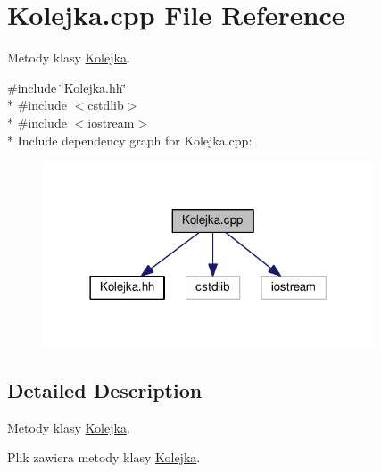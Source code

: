 \hypertarget{a00010}{}\section{Kolejka.\+cpp File Reference}
\label{a00010}


Metody klasy \hyperlink{a00003}{Kolejka}.  


{\ttfamily \#include \char`\"{}Kolejka.\+hh\char`\"{}}\\*
{\ttfamily \#include $<$cstdlib$>$}\\*
{\ttfamily \#include $<$iostream$>$}\\*
Include dependency graph for Kolejka.\+cpp\+:\nopagebreak
\begin{figure}[H]
\begin{center}
\leavevmode
\includegraphics[width=278pt]{a00024}
\end{center}
\end{figure}


\subsection{Detailed Description}
Metody klasy \hyperlink{a00003}{Kolejka}. 

Plik zawiera metody klasy \hyperlink{a00003}{Kolejka}. 